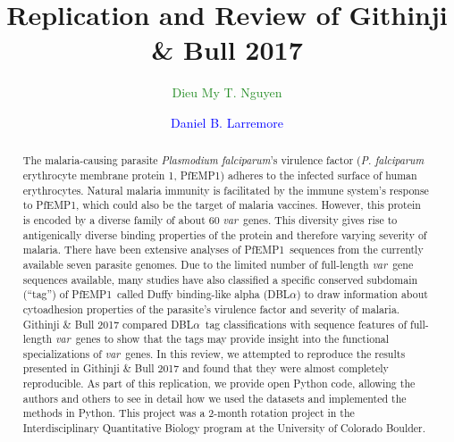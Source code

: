 \documentclass[10pt,twocolumn,superscriptaddress]{revtex4-1}
\newcommand{\dieumy}[1]{\textcolor{ForestGreen}{#1}}
\newcommand{\dan}[1]{\textcolor{blue}{#1}}
\newcommand{\var}{{\it var}\xspace}
\newcommand{\pf}{{\it P. falciparum}\xspace}
\newcommand{\pfem}{{PfEMP1}\xspace}
\newcommand{\dbla}{{DBL$\alpha$}\xspace}
\newcommand{\paper}{{Githinji \& Bull}\xspace}
\begin{document}
\author{\dieumy{Dieu My T. Nguyen}}
\author{\dan{Daniel B. Larremore}}
	

\title{Replication and Review of \paper 2017}
\begin{abstract}
The malaria-causing parasite \textit{Plasmodium falciparum}'s virulence factor (\pf erythrocyte membrane protein 1, \pfem) adheres to the infected surface of human erythrocytes. Natural malaria immunity is facilitated by the immune system's response to \pfem, which could also be the target of malaria vaccines. However, this protein is encoded by a diverse family of about 60 \var\ genes. This diversity gives rise to antigenically diverse binding properties of the protein and therefore varying severity of malaria. There have been extensive analyses of \pfem\ sequences from the currently available seven parasite genomes. Due to the limited number of full-length \var\ gene sequences available, many studies have also classified a specific conserved subdomain (``tag'') of \pfem\ called Duffy binding-like alpha (\dbla) to draw information about cytoadhesion properties of the parasite's virulence factor and severity of malaria. \paper 2017 compared \dbla\ tag classifications with sequence features of full-length \var\ genes to show that the tags may provide insight into the functional specializations of \var\ genes. In this review, we attempted to reproduce the results presented in \paper 2017 and found that they were almost completely reproducible. As part of this replication, we provide open Python code, allowing the authors and others to see in detail how we used the datasets and implemented the methods in Python. This project was a 2-month rotation project in the Interdisciplinary Quantitative Biology program at the University of Colorado Boulder.  
\end{abstract}
\maketitle

\end{document}
